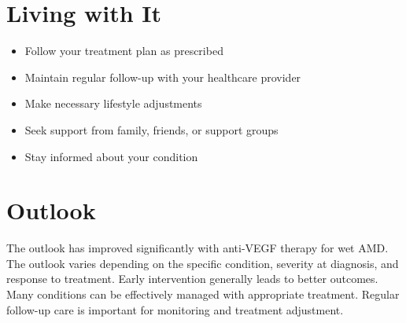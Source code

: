 \section{Living with It}
\begin{itemize}[noitemsep]
  \item Follow your treatment plan as prescribed
  \item Maintain regular follow-up with your healthcare provider
  \item Make necessary lifestyle adjustments
  \item Seek support from family, friends, or support groups
  \item Stay informed about your condition
\end{itemize}
\section{Outlook}
The outlook has improved significantly with anti-VEGF therapy for wet AMD. The outlook varies depending on the specific condition, severity at diagnosis, and response to treatment. Early intervention generally leads to better outcomes. Many conditions can be effectively managed with appropriate treatment. Regular follow-up care is important for monitoring and treatment adjustment.
